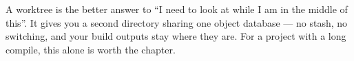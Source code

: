 \begin{moral}
	A worktree is the better answer to ``I need to look at  while I am in
	the middle of this''. It gives you a second directory sharing one object
	database --- no stash, no switching, and your build outputs stay where they
	are. For a project with a long compile, this alone is worth the chapter.
\end{moral}
